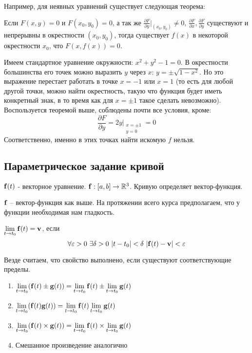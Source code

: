 \documentclass[main]{subfiles}
\begin{document}
Например, для неявных уравнений существует следующая теорема:
\begin{theorem*}
    Если $F(x,y) = 0$ и $F(x_0, y_0) = 0$,
    а так же $\frac{\partial F}{\partial y}\rvert_{(x_0, y_0)} \neq 0$,
    $\frac{\partial F}{\partial x}, \frac{\partial F}{\partial y}$ существуют и непрерывны в окрестности $(x_0, y_0)$,
    тогда существует $f(x)$ в некоторой окрестности $x_0$, что $F(x, f(x)) =0$.
\end{theorem*}
\begin{example}
    Имеем стандартное уравнение окружности: $x^2 + y^2 -1 =0$.
    В окрестности большинства его точек можно выразить $y$ через $x$: $y = \pm \sqrt{1-x^2}$.
    Но это выражение перестает работать в точке $x=-1$ или $x=1$
    (то есть для любой другой точки, можно найти окрестность, такую что функция будет иметь конкретный знак, в то время как для $x= \pm 1$ такое сделать невозможно).
    Воспользуется теоремой выше, соблюдены почти все условия, кроме:
    \[\frac{\partial F}{\partial y} = 2y\rvert_{\substack{x = \pm 1\\ y=0}} = 0\]
    Соответственно, именно в этих точках найти искомую $f$ нельзя.
\end{example}

\subsection{Параметрическое задание кривой}
$\mathbf{f} (t)$ - векторное уравнение. $\mathbf{f}: [a,b] \to \mathbb{R}^3$.
Кривую определяет вектор-функция.

\begin{definition}
    $\mathbf{f}$ -- вектор-функция как выше.
    На протяжении всего курса предполагаем, что у функции необходимая нам гладкость.
\end{definition}

\begin{definition}
    $\displaystyle \lim_{t \to t_0} \mathbf{f} (t) = \mathbf{v}$, если
    \[\forall \epsilon > 0 \ \exists \delta > 0 \ |t - t_0| < \delta \ |\vf(t) - \vv| < \epsilon\]
\end{definition}
\begin{propertylist}
    Везде считаем, что свойство выполнено, если существуют соответствующие пределы.
    \begin{enumerate}
        \item $\displaystyle \lim_{t \to t_0} ( \mathbf{f}(t) \pm \mathbf{g} (t))= \lim_{t \to t_0} \mathbf{f}(t) \pm \lim_{t \to t_0} \mathbf{g} (t) $
        \item $\displaystyle \lim_{t \to t_0} ( \mathbf{f}(t) \mathbf{g} (t))= \lim_{t \to t_0} \mathbf{f}(t) \lim_{t \to t_0} \mathbf{g} (t) $
        \item $\displaystyle \lim_{t \to t_0} ( \mathbf{f}(t) \times \mathbf{g} (t))= \lim_{t \to t_0} \mathbf{f}(t) \times \lim_{t \to t_0} \mathbf{g} (t) $
        \item Смешанное произведение аналогично
    \end{enumerate}
\end{propertylist}
\end{document}
